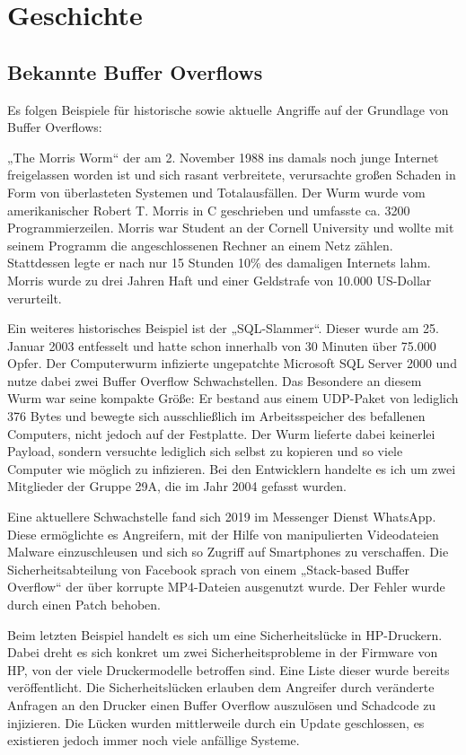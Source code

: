 \section{Geschichte}
\subsection{Bekannte Buffer Overflows}
Es folgen Beispiele für historische sowie aktuelle Angriffe auf der Grundlage von Buffer Overflows:

„The Morris Worm“ der am 2. November 1988 ins damals noch junge Internet freigelassen worden ist und sich rasant verbreitete,
verursachte großen Schaden in Form von überlasteten Systemen und Totalausfällen. Der Wurm wurde vom amerikanischer Robert T. Morris in C geschrieben
und umfasste ca. 3200 Programmierzeilen. Morris war Student an der Cornell University und wollte mit seinem Programm die angeschlossenen Rechner an einem Netz zählen.
Stattdessen legte er nach nur 15 Stunden 10\% des damaligen Internets lahm. Morris wurde zu drei Jahren Haft und einer Geldstrafe von 10.000 US-Dollar verurteilt.

Ein weiteres historisches Beispiel ist der „SQL-Slammer“. Dieser wurde am 25. Januar 2003 entfesselt und hatte schon innerhalb von 30 Minuten über 75.000 Opfer.
Der Computerwurm infizierte ungepatchte Microsoft SQL Server 2000 und nutze dabei zwei Buffer Overflow Schwachstellen.
Das Besondere an diesem Wurm war seine kompakte Größe: Er bestand aus einem UDP-Paket von lediglich 376 Bytes und bewegte sich ausschließlich im Arbeitsspeicher des befallenen
Computers, nicht jedoch auf der Festplatte. Der Wurm lieferte dabei keinerlei Payload, sondern versuchte lediglich sich selbst zu kopieren und
so viele Computer wie möglich zu infizieren. Bei den Entwicklern handelte es ich um zwei Mitglieder der Gruppe 29A, die im Jahr 2004 gefasst wurden.

Eine aktuellere Schwachstelle fand sich 2019 im Messenger Dienst WhatsApp. Diese ermöglichte es Angreifern,
mit der Hilfe von manipulierten Videodateien Malware einzuschleusen und sich so Zugriff auf Smartphones zu verschaffen.
Die Sicherheitsabteilung von Facebook sprach von einem „Stack-based Buffer Overflow“ der über korrupte MP4-Dateien ausgenutzt wurde.
Der Fehler wurde durch einen Patch behoben.

Beim letzten Beispiel handelt es sich um eine Sicherheitslücke in HP-Druckern.
Dabei dreht es sich konkret um zwei Sicherheitsprobleme in der Firmware von HP, von der viele Druckermodelle betroffen sind.
Eine Liste dieser wurde bereits veröffentlicht. Die Sicherheitslücken erlauben dem Angreifer durch veränderte Anfragen an den Drucker einen Buffer Overflow auszulösen
und Schadcode zu injizieren. Die Lücken wurden mittlerweile durch ein Update geschlossen, es existieren jedoch immer noch viele anfällige Systeme.
